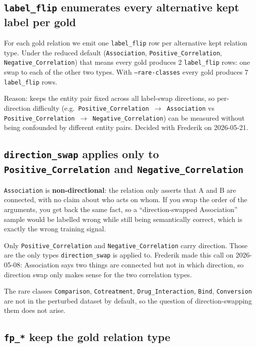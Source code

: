\documentclass[11pt,a4paper]{article}
\newcommand{\code}[1]{\texttt{#1}}
\begin{document}
\subsection*{\code{label\_flip} enumerates every alternative kept label per gold}

For each gold relation we emit one \code{label\_flip} row per alternative kept relation type. Under the reduced default (\code{Association}, \code{Positive\_Correlation}, \code{Negative\_Correlation}) that means every gold produces 2 \code{label\_flip} rows: one swap to each of the other two types. With \code{--rare-classes} every gold produces 7 \code{label\_flip} rows.

Reason: keeps the entity pair fixed across all label-swap directions, so per-direction difficulty (e.g.\ \code{Positive\_Correlation $\to$ Association} vs \code{Positive\_Correlation $\to$ Negative\_Correlation}) can be measured without being confounded by different entity pairs. Decided with Frederik on 2026-05-21.

\subsection*{\code{direction\_swap} applies only to \code{Positive\_Correlation} and \code{Negative\_Correlation}}

\code{Association} is \textbf{non-directional}: the relation only asserts that A and B are connected, with no claim about who acts on whom. If you swap the order of the arguments, you get back the same fact, so a ``direction-swapped Association'' sample would be labelled wrong while still being semantically correct, which is exactly the wrong training signal.

Only \code{Positive\_Correlation} and \code{Negative\_Correlation} carry direction. Those are the only types \code{direction\_swap} is applied to. Frederik made this call on 2026-05-08: Association says two things are connected but not in which direction, so direction swap only makes sense for the two correlation types.

The rare classes \code{Comparison}, \code{Cotreatment}, \code{Drug\_Interaction}, \code{Bind}, \code{Conversion} are not in the perturbed dataset by default, so the question of direction-swapping them does not arise.

\subsection*{\code{fp\_*} keep the gold relation type}
\end{document}
